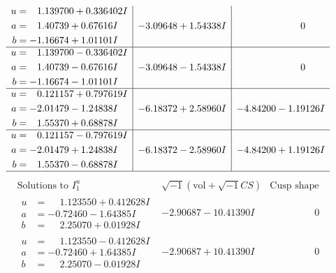 \documentclass[1p]{elsarticle_modified}
\theoremstyle{definition}
\newcommand{\I}{\sqrt{-1}}
\begin{document}
$$\begin{array}{c|c|c}
\begin{aligned}
u &= \phantom{-}1.139700 + 0.336402 I \\
a &= \phantom{-}1.40739 + 0.67616 I \\
b &= -1.16674 + 1.01101 I\end{aligned}
 & -3.09648 + 1.54338 I & \phantom{-0.000000 } 0 \\ \hline\begin{aligned}
u &= \phantom{-}1.139700 - 0.336402 I \\
a &= \phantom{-}1.40739 - 0.67616 I \\
b &= -1.16674 - 1.01101 I\end{aligned}
 & -3.09648 - 1.54338 I & \phantom{-0.000000 } 0 \\ \hline\begin{aligned}
u &= \phantom{-}0.121157 + 0.797619 I \\
a &= -2.01479 - 1.24838 I \\
b &= \phantom{-}1.55370 + 0.68878 I\end{aligned}
 & -6.18372 + 2.58960 I & -4.84200 - 1.19126 I \\ \hline\begin{aligned}
u &= \phantom{-}0.121157 - 0.797619 I \\
a &= -2.01479 + 1.24838 I \\
b &= \phantom{-}1.55370 - 0.68878 I\end{aligned}
 & -6.18372 - 2.58960 I & -4.84200 + 1.19126 I\\
 \hline 
 \end{array}$$\newpage$$\begin{array}{c|c|c}  
\text{Solutions to }I^u_{1}& \I (\text{vol} + \sqrt{-1}CS) & \text{Cusp shape}\\
 \hline 
\begin{aligned}
u &= \phantom{-}1.123550 + 0.412628 I \\
a &= -0.72460 - 1.64385 I \\
b &= \phantom{-}2.25070 + 0.01928 I\end{aligned}
 & -2.90687 - 10.41390 I & \phantom{-0.000000 } 0 \\ \hline\begin{aligned}
u &= \phantom{-}1.123550 - 0.412628 I \\
a &= -0.72460 + 1.64385 I \\
b &= \phantom{-}2.25070 - 0.01928 I\end{aligned}
 & -2.90687 + 10.41390 I & \phantom{-0.000000 } 0 \\ \hline\begin{aligned}

\end{aligned}
\end{array}$$
\end{document}
